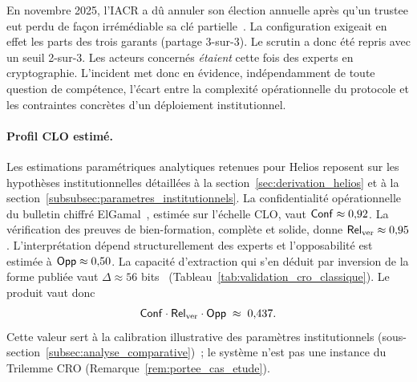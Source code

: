 \begin{sloppypar}
En novembre 2025, l'IACR a d\^u annuler son \'election annuelle apr\`es qu'un
trustee eut perdu de fa\c{c}on irr\'em\'ediable sa cl\'e partielle~\cite{IACR2025incident}.
La configuration exigeait en effet les parts des trois garants (partage 3-sur-3).
Le scrutin a donc \'et\'e repris avec un seuil 2-sur-3. Les acteurs concern\'es
\textit{\'etaient} cette fois des experts en cryptographie. L'incident
met donc en \'evidence, ind\'ependamment de toute question de comp\'etence,
l'\'ecart entre la complexit\'e op\'erationnelle du protocole et les
contraintes concr\`etes d'un d\'eploiement institutionnel.

\paragraph{Profil CLO estim\'e.}
\label{par:helios_clo}

Les estimations param\'etriques analytiques retenues pour Helios reposent sur les
hypoth\`eses institutionnelles d\'etaill\'ees \`a la
section~\ref{sec:derivation_helios} et \`a la section~\ref{subsubsec:parametres_institutionnels}.
La confidentialit\'e op\'erationnelle du bulletin chiffr\'e ElGamal~\cite{TsiounisYung}, estim\'ee sur l'\'echelle CLO, vaut $\mathsf{Conf} \approx 0{,}92$.
La v\'erification des preuves de bien-formation, compl\`ete et solide, donne $\mathsf{Rel}_{\mathrm{ver}} \approx 0{,}95$.
L'interpr\'etation d\'epend structurellement des experts et l'opposabilit\'e est estim\'ee \`a $\mathsf{Opp} \approx 0{,}50$. La capacit\'e d'extraction qui s'en d\'eduit par inversion de la forme publi\'ee vaut $\Delta \approx 56$ bits~\cite{MINKA2026CRO} (Tableau~\ref{tab:validation_cro_classique}).
Le produit vaut donc
\begin{equation}
\mathsf{Conf} \cdot \mathsf{Rel}_{\mathrm{ver}} \cdot \mathsf{Opp} \;\approx\; 0{,}437.
\label{eq:helios_cro}
\end{equation}
Cette valeur sert \`a la calibration illustrative des param\`etres
institutionnels (sous-section~\ref{subsec:analyse_comparative})~; le syst\`eme
n'est pas une instance du Trilemme CRO (Remarque~\ref{rem:portee_cas_etude}).

\end{sloppypar}

